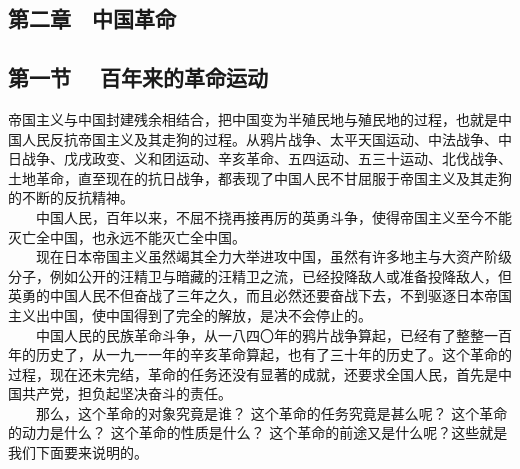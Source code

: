 \documentclass[cn,11pt,chinese]{elegantbook}
\def\myformat#1{\hfil\hfil #1}
\begin{document}
\subsection*{\myformat{第二章　中国革命}}
\subsection*{\myformat{第一节　 百年来的革命运动}}
帝国主义与中国封建残余相结合，把中国变为半殖民地与殖民地的过程，也就是中国人民反抗帝国主义及其走狗的过程。从鸦片战争、太平天国运动、中法战争、中日战争、戊戌政变、义和团运动、辛亥革命、五四运动、五三十运动、北伐战争、土地革命，直至现在的抗日战争，都表现了中国人民不甘屈服于帝国主义及其走狗的不断的反抗精神。\\
　　中国人民，百年以来，不屈不挠再接再厉的英勇斗争，使得帝国主义至今不能灭亡全中国，也永远不能灭亡全中国。\\
　　现在日本帝国主义虽然竭其全力大举进攻中国，虽然有许多地主与大资产阶级分子，例如公开的汪精卫与暗藏的汪精卫之流，已经投降敌人或准备投降敌人，但英勇的中国人民不但奋战了三年之久，而且必然还要奋战下去，不到驱逐日本帝国主义出中国，使中国得到了完全的解放，是决不会停止的。\\
　　中国人民的民族革命斗争，从一八四〇年的鸦片战争算起，已经有了整整一百年的历史了，从一九一一年的辛亥革命算起，也有了三十年的历史了。这个革命的过程，现在还未完结，革命的任务还没有显著的成就，还要求全国人民，首先是中国共产党，担负起坚决奋斗的责任。\\
　　那么，这个革命的对象究竟是谁？ 这个革命的任务究竟是甚么呢？ 这个革命的动力是什么？  这个革命的性质是什么？  这个革命的前途又是什么呢？这些就是我们下面要来说明的。\\
\end{document}
